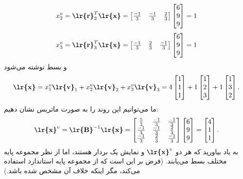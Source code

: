 \documentclass[a4paper,12pt]{report}
\begin{document}
     	 $$
     	 x_2^v=\textbf{\lr{r}}_2^T\textbf{\lr{x}}=
     	 \begin{bmatrix}
     	 	\frac{-1}3 & \frac{-1}3 & \frac23
     	 \end{bmatrix}
     	 \begin{bmatrix}
     	 	6 \\ 9 \\ 9
     	 \end{bmatrix}
     	 =1
     	 $$
     	 $$
     	 x_3^v=\textbf{\lr{r}}_3^T\textbf{\lr{x}}=
     	 \begin{bmatrix}
     	 	\frac{-1}3 & \frac23 & \frac{-1}3
     	 \end{bmatrix}
     	 \begin{bmatrix}
     	 	6 \\ 9 \\ 9
     	 \end{bmatrix}
     	 =1
     	 $$
     	 و بسط نوشته می‌شود
     	 $$
     	 \textbf{\lr{x}}=x_1^v\textbf{\lr{v}}_1+
     	 x_2^v\textbf{\lr{v}}_2+x_3^v\textbf{\lr{v}}_3=4
     	 \begin{bmatrix}
     	 	1 \\ 1 \\ 1
     	 \end{bmatrix}
       	 +1
       	 \begin{bmatrix}
       	 	1 \\ 2 \\ 3
       	 \end{bmatrix} 
         +1
         \begin{bmatrix}
         	1 \\ 3 \\ 2
         \end{bmatrix}.  	 
     	 $$
     	 ما می‌توانیم این روند را به صورت ماتریس نشان دهیم:
     	 $$
     	 \textbf{\lr{x}}^v=\textbf{\lr{B}}^{-1}\textbf{\lr{x}}=
     	 \begin{bmatrix}
     	 	\frac53 & \frac{-1}3 & \frac{-1}3 \\
     	 	\frac{-1}3 & \frac{-1}3 & \frac23 \\
     	 	\frac{-1}3 & \frac23 & \frac{-1}3
     	 \end{bmatrix}     	 
      	 \begin{bmatrix}
      	 	6 \\ 9 \\ 9
      	 \end{bmatrix}
         =
         \begin{bmatrix}
         	4 \\ 1 \\ 1
         \end{bmatrix}.
     	 $$
     	 به یاد بیاورید که هر دو 
     	 $ \textbf{\lr{x}}^v $
     	  و \textbf{} نمایش یک بردار هستند، اما از نظر مجموعه پایه مختلف بسط می‌یابند. (فرض بر این است که \textbf{} از مجموعه پایه استاندارد استفاده می‌کند، مگر اینکه خلاف آن مشخص شده باشد.)
     	  \vspace{20cm}
\end{document}
